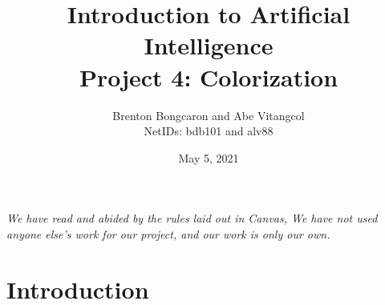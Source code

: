 \documentclass[11pt]{article}
\title{\textbf{Introduction to Artificial Intelligence\\
		\large Project 4: Colorization}}
\author{Brenton Bongcaron and Abe Vitangcol\\NetIDs: bdb101 and alv88}
\date{May 5, 2021}
\begin{document}
	\maketitle
\textit{We have read and abided by the rules laid out in Canvas, We have not used anyone else's work for our project, and our work is only our own.}
\tableofcontents
\listoffigures
\pagebreak
\section{Introduction}
\end{document}
